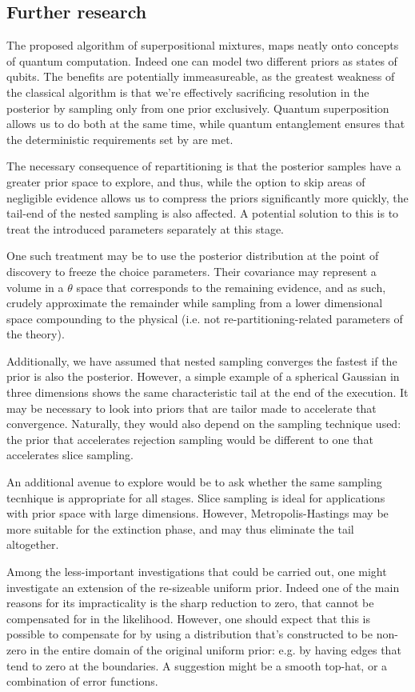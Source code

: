 \documentclass[usenatbib]{mnras}
\begin{document}
\subsection{Further research}
\label{sec:org74a56cd}
The proposed algorithm of superpositional mixtures, maps neatly
onto concepts of quantum computation. Indeed one can model two
different priors as states of qubits. The benefits are potentially
immeasureable, as the greatest weakness of the classical algorithm
is that we're effectively sacrificing resolution in the posterior
by sampling only from one prior exclusively. Quantum superposition
allows us to do both at the same time, while quantum entanglement
ensures that the deterministic requirements set by
\citeauthor{skilling2006} are met.

The necessary consequence of repartitioning is that the posterior
samples have a greater prior space to explore, and thus, while the
option to skip areas of negligible evidence allows us to compress
the priors significantly more quickly, the tail-end of the nested
sampling is also affected. A potential solution to this is to treat
the introduced parameters separately at this stage.

One such treatment may be to use the posterior distribution at the
point of discovery to freeze the choice parameters. Their
covariance may represent a volume in a \(\theta\) space that
corresponds to the remaining evidence, and as such, crudely
approximate the remainder while sampling from a lower dimensional
space compounding to the physical (i.e. not re-partitioning-related
parameters of the theory).

Additionally, we have assumed that nested sampling converges the
fastest if the prior is also the posterior. However, a simple
example of a spherical Gaussian in three dimensions shows the same
characteristic tail at the end of the execution. It may be
necessary to look into priors that are tailor made to accelerate
that convergence. Naturally, they would also depend on the sampling
technique used: the prior that accelerates rejection sampling would
be different to one that accelerates slice sampling.

An additional avenue to explore would be to ask whether the same
sampling tecnhique is appropriate for all stages. Slice sampling is
ideal for applications with prior space with large
dimensions. However, Metropolis-Hastings may be more suitable for
the extinction phase, and may thus eliminate the tail altogether.

Among the less-important investigations that could be carried out,
one might investigate an extension of the re-sizeable uniform
prior. Indeed one of the main reasons for its impracticality is the
sharp reduction to zero, that cannot be compensated for in the
likelihood. However, one should expect that this is possible to
compensate for by using a distribution that's constructed to be
non-zero in the entire domain of the original uniform prior:
e.g. by having edges that tend to zero at the boundaries. A
suggestion might be a smooth top-hat, or a combination of error
functions.
\end{document}
